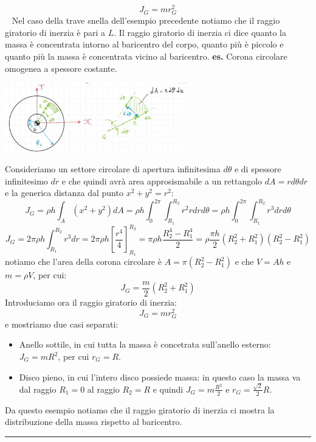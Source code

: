 \[
    J_G = m r_G^2
\]
\ \newline
Nel caso della trave snella dell'esempio precedente notiamo che il raggio giratorio di inerzia è pari a $L$.\newline
\newline
Il raggio giratorio di inerzia ci dice quanto la massa è concentrata intorno al baricentro del corpo, quanto più è piccolo e quanto più la massa è concentrata vicino al baricentro.
\newline
\newline
\textbf{es.} Corona circolare omogenea a spessore costante.
\begin{center}
    \includegraphics[height=3cm]{../lezione8/img7.JPG}
\end{center}
Consideriamo un settore circolare di apertura infinitesima $d \theta$ e di spessore infinitesimo $d r$ e che quindi avrà area approsismabile a un rettangolo $dA = r d \theta d r$ e la generica distanza dal punto $x^2 + y^2 = r^2$:
\[
    J_G = \rho h \int_A (x^2 + y^2) dA = \rho h \int_{0}^{2\pi} \int_{R_1}^{R_2} r^2 r d r d \theta = \rho h \int_{0}^{2\pi} \int_{R_1}^{R_2} r^3 d r d \theta
\]
\[
    J_G = 2 \pi \rho h \int_{R_1}^{R_2} r^3 dr = 2 \pi \rho h \left[\frac{r^4}{4}\right]_{R_1}^{R_2} = \pi \rho h \frac{R_2^4 - R_1^4}{2} = \rho \frac{\pi h }{2} (R_2^2 + R_1^2) (R_2^2 - R_1^2)
\]
notiamo che l'area della corona circolare è $A = \pi (R_2^2 -R_1^2)$ e che $V = A h$ e $m = \rho V$, per cui:
\[
    J_G = \frac{m}{2}(R_2^2 + R_1^2)
\]
Introduciamo ora il raggio giratorio di inerzia:
\[
    J_G = m r_G^2
\]
e mostriamo due casi separati:
\begin{itemize}
    \item Anello sottile, in cui tutta la massa è concetrata sull'anello esterno: $J_G = m R^2$, per cui $r_G = R$.
    \item Disco pieno, in cui l'intero disco possiede massa: in questo caso la massa va dal raggio $R_1= 0$ al raggio $R_2 = R$ e quindi $J_G = m \frac{R^2}{2}$ e $r_G = \frac{\sqrt{2}}{2}R$.
\end{itemize}
Da questo esempio notiamo che il raggio giratorio di inerzia ci mostra la distribuzione della massa rispetto al baricentro.\newline
\rule{\textwidth}{0,4pt}